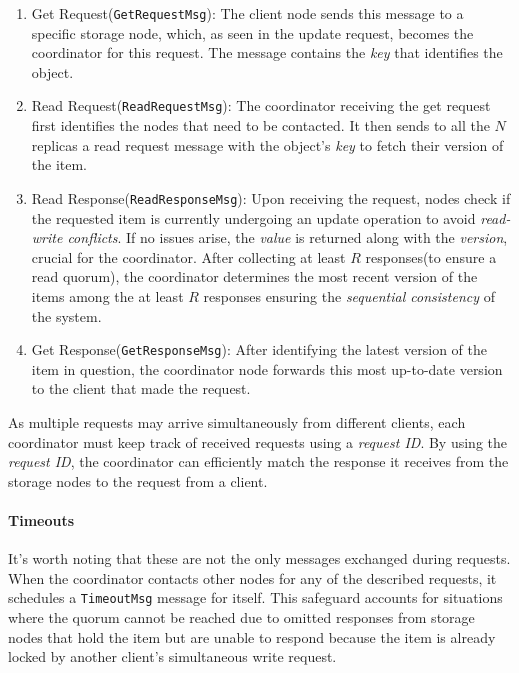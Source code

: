 \documentclass[a4paper, 11pt]{article}
\begin{document}
\begin{enumerate}
    \item Get Request(\verb|GetRequestMsg|): The client node sends this message to a specific storage node, which, as seen in the update request, becomes the coordinator for this request. The message contains the \textit{key} that identifies the object.

    \item Read Request(\verb|ReadRequestMsg|): The coordinator receiving the get request first identifies the nodes that need to be contacted. It then sends to all the $N$ replicas a read request message with the object's \textit{key} to fetch their version of the item.

    \item Read Response(\verb|ReadResponseMsg|): Upon receiving the request, nodes check if the requested item is currently undergoing an update operation to avoid \textit{read-write conflicts}. If no issues arise, the \textit{value} is returned along with the \textit{version}, crucial for the coordinator. After collecting at least $R$ responses(to ensure a read quorum), the coordinator determines the most recent version of the items among the at least $R$ responses ensuring the \textit{sequential consistency} of the system.

    \item Get Response(\verb|GetResponseMsg|): After identifying the latest version of the item in question, the coordinator node forwards this most up-to-date version to the client that made the request.
\end{enumerate}

\begin{Summary}
As multiple requests may arrive simultaneously from different clients, each coordinator must keep track of received requests using a \textit{request ID}. By using the \textit{request ID}, the coordinator can efficiently match the response it receives from the storage nodes to the request from a client.
\end{Summary}

\paragraph{Timeouts} It's worth noting that these are not the only messages exchanged during requests. When the coordinator contacts other nodes for any of the described requests, it schedules a \verb|TimeoutMsg| message for itself. This safeguard accounts for situations where the quorum cannot be reached due to omitted responses from storage nodes that hold the item but are unable to respond because the item is already locked by another client's simultaneous write request.
\end{document}

